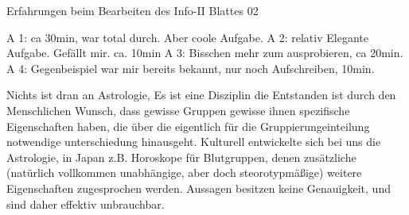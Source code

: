 Erfahrungen beim Bearbeiten des Info-II Blattes 02

A 1: ca 30min, war total durch. Aber coole Aufgabe.
A 2: relativ Elegante Aufgabe. Gefällt mir. ca. 10min
A 3: Bisschen mehr zum ausprobieren, ca 20min.
A 4: Gegenbeispiel war mir bereits bekannt, nur noch Aufschreiben, 10min.


Nichts ist dran an Astrologie, Es ist eine Disziplin die Entstanden ist durch den Menschlichen Wunsch,
dass gewisse Gruppen gewisse ihnen spezifische Eigenschaften haben, die über die eigentlich für die
Gruppierungeinteilung notwendige unterschiedung hinausgeht. Kulturell entwickelte sich bei uns
die Astrologie, in Japan z.B. Horoskope für Blutgruppen, denen zusätzliche (natürlich vollkommen
unabhängige, aber doch steorotypmäßige) weitere Eigenschaften zugesprochen werden.
Aussagen besitzen keine Genauigkeit, und sind daher effektiv unbrauchbar.


